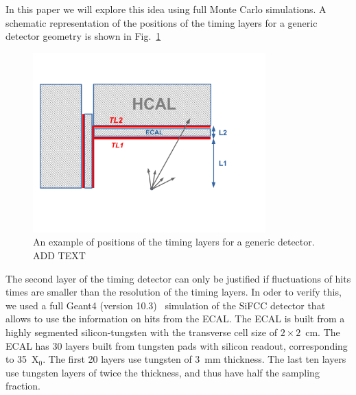 \documentclass[final,1p,11pt]{elsarticle}
\begin{document}
In this paper we will explore this idea using full Monte Carlo simulations. 
A schematic representation of the positions of the timing layers for a generic detector geometry is shown in Fig.~\ref{fig:eff_rad}



\begin{figure}
\begin{center}
   \includegraphics[width=0.8\textwidth]{timing_layer.pdf}\hfill
\end{center}
\caption{An example of positions of the timing layers for a generic detector. ADD TEXT}
\label{fig:eff_rad}
\end{figure}


The second layer of the timing detector can only be justified if fluctuations of hits times are smaller than  the resolution 
of the timing layers. In oder to verify this, we used a full Geant4 (version 10.3)~\cite{Allison2016186} simulation 
of the SiFCC detector \cite{Chekanov:2016ppq} that allows to use the information on hits from the ECAL.
The ECAL is built from a highly segmented silicon-tungsten  with the transverse cell size of $2 \times 2$~cm.
The ECAL has 30 layers built from tungsten pads with silicon readout,
corresponding to 35~X$_{0}$. The first 20 layers use tungsten of 3~mm thickness.
The last ten layers use tungsten layers of
twice the thickness, and thus have half the  sampling fraction.  
\end{document}
